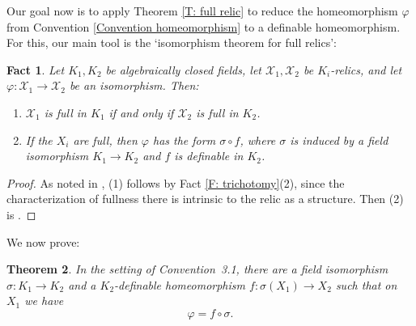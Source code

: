 \documentclass{amsart}
\newtheorem{theorem}{Theorem}[section]
\newtheorem{fact}[theorem]{Fact}
\theoremstyle{definition}
\begin{document}
Our goal now is to apply Theorem \ref{T: full relic} to reduce the homeomorphism $\varphi$ from Convention \ref{Convention homeomorphism} to a definable homeomorphism. For this, our main tool is the `isomorphism theorem for full relics':

\begin{fact}\label{F: isomorphism theorem}
Let $K_1, K_2$ be algebraically closed fields, let $\mathcal{X}_1, \mathcal{X}_2$ be $K_i$-relics, and let $\varphi:\mathcal X_1\rightarrow\mathcal X_2$ be an isomorphism. Then:

\begin{enumerate}
    \item $\mathcal X_1$ is full in $K_1$ if and only if $\mathcal X_2$ is full in $K_2$.
    \item If the $X_i$ are full, then $\varphi$ has the form $\sigma \circ f$, where $\sigma$ is induced by a field isomorphism $K_1 \to K_2$ and $f$ is definable in $K_2$.
\end{enumerate}
\end{fact}
\begin{proof}
    As noted in \cite[Remark 4.13]{CasHasVA}, (1) follows by Fact \ref{F: trichotomy}(2), since the characterization of fullness there is intrinsic to the relic as a structure. Then (2) is \cite[Lemma 2.6]{CaHaDC}.
\end{proof}

We now prove:

\begin{theorem}\label{T: reduction to definable case}
In the setting of Convention~3.1, there are a field isomorphism $\sigma : K_1 \to K_2$ and a $K_2$-definable homeomorphism $f : \sigma(X_1) \to X_2$ such that on $X_1$ we have
\[
\varphi = f \circ \sigma.
\]
\end{theorem}
\end{document}
